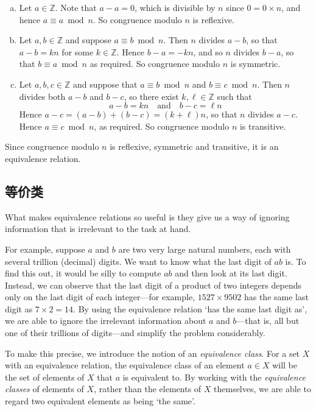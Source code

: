 \begin{cproof}
\fixlistskip
\begin{enumerate}[(a)]
\item Let $a \in \mathbb{Z}$. Note that $a-a=0$, which is divisible by $n$ since $0 = 0 \times n$, and hence $a \equiv a \bmod n$. So congruence modulo $n$ is reflexive.
\item Let $a,b \in \mathbb{Z}$ and suppose $a \equiv b \bmod n$. Then $n$ divides $a-b$, so that $a-b = kn$ for some $k \in \mathbb{Z}$. Hence $b-a=-kn$, and so $n$ divides $b-a$, so that $b \equiv a \bmod n$ as required. So congruence modulo $n$ is symmetric.
\item Let $a,b,c \in \mathbb{Z}$ and suppose that $a \equiv b \bmod n$ and $b \equiv c \bmod n$. Then $n$ divides both $a-b$ and $b-c$, so there exist $k, \ell \in \mathbb{Z}$ such that
\[ a-b = kn \quad \text{and} \quad b-c = \ell n \]
Hence $a-c = (a-b)+(b-c) = (k+\ell)n$, so that $n$ divides $a-c$. Hence $a \equiv c \bmod n$, as required. So congruence modulo $n$ is transitive.
\end{enumerate}
Since congruence modulo $n$ is reflexive, symmetric and transitive, it is an equivalence relation.
\end{cproof}

\subsection*{等价类}

What makes equivalence relations so useful is they give us a way of ignoring information that is irrelevant to the task at hand.

For example, suppose $a$ and $b$ are two very large natural numbers, each with several trillion (decimal) digits. We want to know what the last digit of $ab$ is. To find this out, it would be silly to compute $ab$ and then look at its last digit. Instead, we can observe that the last digit of a product of two integers depends only on the last digit of each integer---for example, $1527 \times 9502$ has the same last digit as $7 \times 2 = 14$. By using the equivalence relation `has the same last digit as', we are able to ignore the irrelevant information about $a$ and $b$---that is, all but one of their trillions of digits---and simplify the problem considerably.

To make this precise, we introduce the notion of an \textit{equivalence class}. For a set $X$ with an equivalence relation, the equivalence class of an element $a \in X$ will be the set of elements of $X$ that $a$ is equivalent to. By working with the \textit{equivalence classes} of elements of $X$, rather than the elements of $X$ themselves, we are able to regard two equivalent elements as being `the same'.

